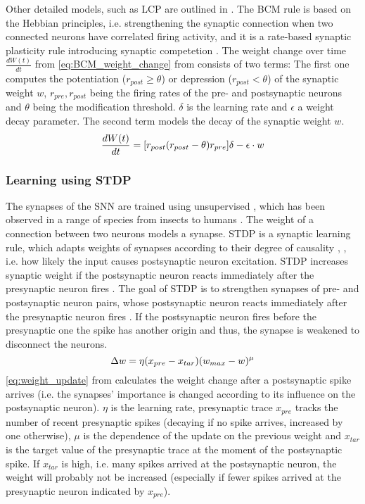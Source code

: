 Other detailed models, such as \ac{LCP} are outlined in \cite{Synaptic_plasticity}.
The \ac{BCM} rule is based on the Hebbian principles, i.e. strengthening the synaptic connection when two connected neurons have correlated firing activity, 
and it is a rate-based synaptic plasticity rule introducing synaptic competetion \cite{simulation_STDP}.
The weight change over time $\frac{dW(t)}{dt}$ from \autoref{eq:BCM_weight_change} from \cite{simulation_STDP} consists of two terms:
The first one computes the potentiation ($r_{post} \ge \theta$) or depression ($r_{post} < \theta$) of the synaptic weight $w$, 
$r_{pre}, r_{post}$ being the firing rates of the pre- and postsynaptic neurons and $\theta$ being the modification threshold.
$\delta$ is the learning rate and $\epsilon$ a weight decay parameter.
The second term models the decay of the synaptic weight $w$.
%
\begin{equation}
    \centering
    \label{eq:BCM_weight_change}
    \frac{dW(t)}{dt} = [r_{post}(r_{post} - \theta)r_{pre}]\delta - \epsilon \cdot w
\end{equation}


\subsubsection{Learning using \ac{STDP}}
The synapses of the \ac{SNN} are trained using unsupervised , which has been observed in a range of species from insects to humans \cite{STDP_hebbian}. 
The weight of a connection between two neurons models a synapse.
\ac{STDP} is a synaptic learning rule, which adapts weights of synapses according to their degree of causality \cite{STDP_like}, \cite{multi_scale_STDP},
 i.e. how likely the input causes postsynaptic neuron excitation.
\ac{STDP} increases synaptic weight if the postsynaptic neuron reacts immediately after the presynaptic neuron fires \cite{object_detection_SNN}.
The goal of \ac{STDP} is to strengthen synapses of pre- and postsynaptic neuron pairs, 
whose postsynaptic neuron reacts immediately after the presynaptic neuron fires \cite{object_detection_SNN}.
If the postsynaptic neuron fires before the presynaptic one the spike has another origin and thus, the synapse is weakened to disconnect the neurons.
%
\begin{equation}
    \centering
    \label{eq:weight_update}
    \Delta w = \eta (x_{pre} - x_{tar})(w_{max}-w)^\mu
\end{equation}
%
\autoref{eq:weight_update} from \cite{SNN} calculates the weight change after a postsynaptic spike arrives 
(i.e. the synapses' importance is changed according to its influence on the postsynaptic neuron).
$\eta$ is the learning rate, presynaptic trace $x_{pre}$ tracks the number of recent presynaptic spikes 
(decaying if no spike arrives, increased by one otherwise), 
$\mu$ is the dependence of the update on the previous weight and 
$x_{tar}$ is the target value of the presynaptic trace at the moment of the postsynaptic spike.
If $x_{tar}$ is high, i.e. many spikes arrived at the postsynaptic neuron, the weight will probably not be increased 
(especially if fewer spikes arrived at the presynaptic neuron indicated by  $x_{pre}$).

